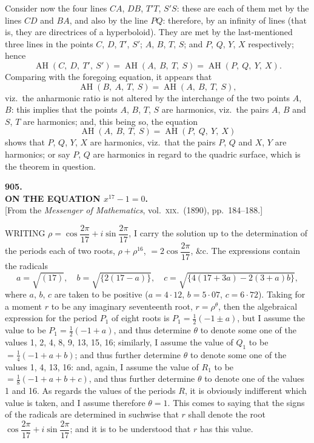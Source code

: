 \documentclass[11pt,a4paper]{article}
\providecommand{\AH}{\operatorname{AH}}
\begin{document}
Consider now the four lines $CA$, $DB$, $T'T$, $S'S$: these are each of them met by the lines $CD$ and $BA$, and also by the line $PQ$: therefore, by an infinity of lines (that is, they are directrices of a hyperboloid). They are met by the last-mentioned three lines in the points $C$, $D$, $T'$, $S'$; $A$, $B$, $T$, $S$; and $P$, $Q$, $Y$, $X$ respectively; hence
\[
\AH(C,\ D,\ T',\ S') = \AH(A,\ B,\ T,\ S) = \AH(P,\ Q,\ Y,\ X).
\]
Comparing with the foregoing equation, it appears that
\[
\AH(B,\ A,\ T,\ S) = \AH(A,\ B,\ T,\ S),
\]
viz.\ the anharmonic ratio is not altered by the interchange of the two points $A$, $B$: this implies that the points $A$, $B$, $T$, $S$ are harmonics, viz.\ the pairs $A$, $B$ and $S$, $T$ are harmonics; and, this being so, the equation
\[
\AH(A,\ B,\ T,\ S) = \AH(P,\ Q,\ Y,\ X)
\]
shows that $P$, $Q$, $Y$, $X$ are harmonics, viz.\ that the pairs $P$, $Q$ and $X$, $Y$ are harmonics; or say $P$, $Q$ are harmonics in regard to the quadric surface, which is the theorem in question.

\clearpage

\begin{center}
{\large\bfseries 905.}\\[0.5em]
{\large\bfseries ON THE EQUATION $x^{17} - 1 = 0$.}\\[0.5em]
\small [From the \emph{Messenger of Mathematics}, vol.\ \textsc{xix}.\ (1890), pp.\ 184--188.]
\end{center}
\medskip

\noindent WRITING $\rho = \cos\dfrac{2\pi}{17} + i \sin\dfrac{2\pi}{17}$, I carry the solution up to the determination of the periods each of two roots, $\rho + \rho^{16}$, $= 2\cos\dfrac{2\pi}{17}$, \&c. The expressions contain the radicals
\[
a = \sqrt{(17)},\quad b = \sqrt{\{2(17 - a)\}},\quad c = \sqrt{\{4(17 + 3a) - 2(3 + a)b\}},
\]
where $a$, $b$, $c$ are taken to be positive ($a = 4{\cdot}12$, $b = 5{\cdot}07$, $c = 6{\cdot}72$). Taking for a moment $r$ to be any imaginary seventeenth root, $r = \rho^{\theta}$, then the algebraical expression for the period $P_1$ of eight roots is $P_1 = \tfrac{1}{2}(- 1 \pm a)$, but I assume the value to be $P_1 = \tfrac{1}{2}(- 1 + a)$, and thus determine $\theta$ to denote some one of the values 1, 2, 4, 8, 9, 13, 15, 16; similarly, I assume the value of $Q_1$ to be $= \tfrac{1}{4}(- 1 + a + b)$; and thus further determine $\theta$ to denote some one of the values 1, 4, 13, 16: and, again, I assume the value of $R_1$ to be $= \tfrac{1}{8}(- 1 + a + b + c)$, and thus further determine $\theta$ to denote one of the values 1 and 16. As regards the values of the periods $R$, it is obviously indifferent which value is taken, and I assume therefore $\theta = 1$. This comes to saying that the signs of the radicals are determined in suchwise that $r$ shall denote the root $\cos\dfrac{2\pi}{17} + i\sin\dfrac{2\pi}{17}$; and it is to be understood that $r$ has this value.
\end{document}
